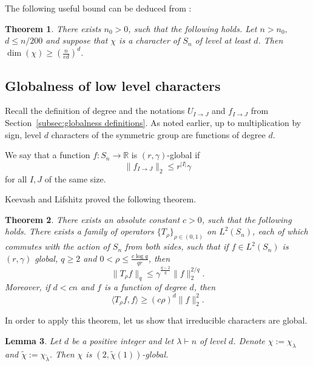\documentclass[11pt, letterpaper]{amsart}
\newtheorem{thm}{Theorem}[section]
\newtheorem{lem}[thm]{Lemma}
\renewcommand\ge{\geqslant}
\renewcommand\le{\leqslant}
\begin{document}
The following useful bound can be deduced from \cite[Claim 1, Claim 2 and Theorem 19]{ellis2011intersecting}:
\begin{thm}
\label{thm:EFP dimensions of representations}
    There exists $n_0>0$, such that the following holds. Let $n>n_0,$ $d\le n/200$ and suppose that $\chi$ is a character of $S_n$ of level at least  $d$. Then $\dim(\chi) \ge \left(\frac{n}{ed}\right)^d$. 
\end{thm}
\subsection{Globalness of low level characters}
Recall the definition of degree and the notations $U_{I\to J}$ and $f_{I\to J}$ from Section~\ref{subsec:globalness definitions}. As noted earlier, up to multiplication by sign, level $d$ characters of the symmetric group are functions of degree $d$.

We say that a function $f\colon S_n\to \mathbb{R}$ is $(r,\gamma)$-global if 
\[\|f_{I\to J}\|_2\le r^{|I|}\gamma\] 
for all $I,J$ of the same size. 

Keevash and Lifshitz \cite[Theorem 1.10]{keevash2023sharp} proved the following theorem. 
\begin{thm}\label{thm:Hypercontractivity EKL}
There exists an absolute constant $c>0$, such that the following holds. There exists a family of operators 
$\{T_{\rho}\}_{\rho \in (0,1)}$ on $L^2(S_n)$, each of which commutes with the action of $S_n$ from both sides, such that 
if $f \in L^2(S_n)$ is $(r,\gamma)$ global, $q\ge 2$ and $0<\rho \le \frac{c\log q}{qr}$, then \[ \|T_{\rho} f\|_q\le \gamma^{\frac{q-2}{q}}\|f\|_2^{2/q}.\]
Moreover, if $d< cn$ and $f$ is a function of degree $d$, then
\[ \langle T_{\rho}f,f \rangle \ge \left(c\rho\right)^d\|f\|_2^2.\]
\end{thm}

In order to apply this theorem, let us show that irreducible characters are global.
\begin{lem}
\label{lem:characters are global}
Let $d$ be a positive integer and let $\lambda\vdash n$ of level $d$. Denote $\chi := \chi_\lambda$ and $\tilde{\chi} := \chi_{\tilde{\lambda}}$.%
Then $\chi$ is $(2, \tilde{\chi}(1))$-global. 
\end{lem}
\end{document}
